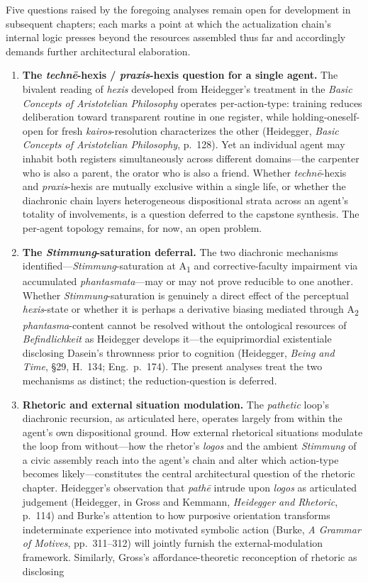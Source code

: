 \documentclass{article}
\begin{document}
Five questions raised by the foregoing analyses remain open for development in subsequent chapters; each marks a point at which the actualization chain's internal logic presses beyond the resources assembled thus far and accordingly demands further architectural elaboration. \begin{enumerate}

\item \textbf{The \textit{technē}-hexis / \textit{praxis}-hexis question for a single agent.} The bivalent reading of \textit{hexis} developed from Heidegger's treatment in the \textit{Basic Concepts of Aristotelian Philosophy} operates per-action-type: training reduces deliberation toward transparent routine in one register, while holding-oneself-open for fresh \textit{kairos}-resolution characterizes the other (Heidegger, \textit{Basic Concepts of Aristotelian Philosophy}, p.~128). Yet an individual agent may inhabit both registers simultaneously across different domains---the carpenter who is also a parent, the orator who is also a friend. Whether \textit{technē}-hexis and \textit{praxis}-hexis are mutually exclusive within a single life, or whether the diachronic chain layers heterogeneous dispositional strata across an agent's totality of involvements, is a question deferred to the capstone synthesis. The per-agent topology remains, for now, an open problem. \item \textbf{The \textit{Stimmung}-saturation deferral.} The two diachronic mechanisms identified---\textit{Stimmung}-saturation at A\textsubscript{1} and corrective-faculty impairment via accumulated \textit{phantasmata}---may or may not prove reducible to one another. Whether \textit{Stimmung}-saturation is genuinely a direct effect of the perceptual \textit{hexis}-state or whether it is perhaps a derivative biasing mediated through A\textsubscript{2} \textit{phantasma}-content cannot be resolved without the ontological resources of \textit{Befindlichkeit} as Heidegger develops it---the equiprimordial existentiale disclosing Dasein's thrownness prior to cognition (Heidegger, \textit{Being and Time}, \S29, H.~134; Eng.~p.~174). The present analyses treat the two mechanisms as distinct; the reduction-question is deferred. \item \textbf{Rhetoric and external situation modulation.} The \textit{pathetic} loop's diachronic recursion, as articulated here, operates largely from within the agent's own dispositional ground. How external rhetorical situations modulate the loop from without---how the rhetor's \textit{logos} and the ambient \textit{Stimmung} of a civic assembly reach into the agent's chain and alter which action-type becomes likely---constitutes the central architectural question of the rhetoric chapter. Heidegger's observation that \textit{pathē} intrude upon \textit{logos} as articulated judgement (Heidegger, in Gross and Kemmann, \textit{Heidegger and Rhetoric}, p.~114) and Burke's attention to how purposive orientation transforms indeterminate experience into motivated symbolic action (Burke, \textit{A Grammar of Motives}, pp.~311--312) will jointly furnish the external-modulation framework. Similarly, Gross's affordance-theoretic reconception of rhetoric as disclosing 
\end{enumerate}
\end{document}
